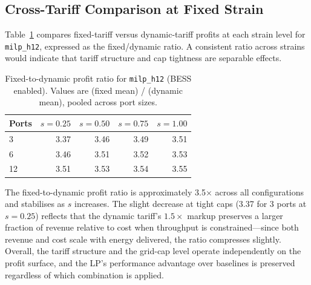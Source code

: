 \subsection{Cross-Tariff Comparison at Fixed Strain}
\label{subsec:gc_cross_tariff}

Table~\ref{tab:gc_tariff_ratio} compares fixed-tariff versus dynamic-tariff
profits at each strain level for \texttt{milp\_h12}, expressed as the
fixed/dynamic ratio.  A consistent ratio across strains would indicate that
tariff structure and cap tightness are separable effects.

\begin{table}[!htb]
\centering
\caption{Fixed-to-dynamic profit ratio for \texttt{milp\_h12} (BESS enabled).
         Values are (fixed mean) / (dynamic mean), pooled across port sizes.}
\label{tab:gc_tariff_ratio}
\begin{tabular}{l rrrr}
\toprule
\textbf{Ports} & $s=0.25$ & $s=0.50$ & $s=0.75$ & $s=1.00$ \\
\midrule
3  & 3.37 & 3.46 & 3.49 & 3.51 \\
6  & 3.46 & 3.51 & 3.52 & 3.53 \\
12 & 3.51 & 3.53 & 3.54 & 3.55 \\
\bottomrule
\end{tabular}
\end{table}

The fixed-to-dynamic profit ratio is approximately 3.5× across all
configurations and stabilises as $s$ increases.  The slight decrease at tight
caps (3.37 for 3 ports at $s=0.25$) reflects that the dynamic tariff's
$1.5\times$ markup preserves a larger fraction of revenue relative to cost when
throughput is constrained—since both revenue and cost scale with energy
delivered, the ratio compresses slightly.  Overall, the tariff structure and
the grid-cap level operate independently on the profit surface, and the LP's
performance advantage over baselines is preserved regardless of which
combination is applied.
